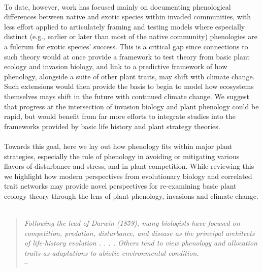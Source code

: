 \documentclass[11pt,a4paper,oneside]{article}
\begin{document}
\\
To date, however, work has focused mainly on documenting phenological differences between native and exotic species within invaded communities, with less effort applied to articulately framing and testing models where especially distinct (e.g., earlier or later than most of the native community) phenologies are a fulcrum for exotic species' success. This is a critical gap since connections to such theory would at once provide a framework to test theory from basic plant ecology and invasion biology, and link to a predictive framework of how phenology, alongside a suite of other plant traits, may shift with climate change. Such extensions would then provide the basis to begin to model how ecosystems themselves mays shift in the future with continued climate change. We suggest that progress at the intersection of invasion biology and plant phenology could be rapid, but would benefit from far more efforts to integrate studies into the frameworks provided by basic life history and plant strategy theories.\\
\\
Towards this goal, here we lay out how phenology fits within major plant strategies, especially the role of phenology in avoiding or mitigating various flavors of disturbance and stress, and in plant competition. While reviewing this we highlight how modern perspectives from evolutionary biology and correlated trait networks may provide novel perspectives for re-examining basic plant ecology theory through the lens of plant phenology, invasions and climate change. \\
\\
\begin{quote} 
\emph{Following the lead of Darwin (1859), many
biologists have focused on competition, predation, disturbance,
and disease as the principal architects of life-history
evolution . . . . Others
tend to view phenology and allocation traits as adaptations
to abiotic environmental condition.} \\
-- \cite{stanton2000}
\end{quote}
\end{document}
